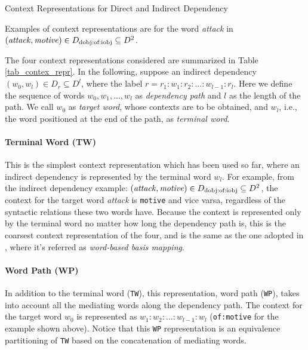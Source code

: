 \documentclass[english]{jnlp_1.4}
\begin{document}
\begin{table}[b]
\caption{Context Representations for Direct and Indirect Dependency}
\label{tab_contex_repr}
\begin{center}

\par
Examples of context representations are for the word {\em attack} in $({\it attack}, {\it motive}) \in D_{\rm dobj:of:iobj} \subseteq D^2$.
\end{center}
\end{table}

The four context representations considered are summarized in Table
\ref{tab_contex_repr}. In the following, suppose an indirect
dependency $(w_0, w_l) \in D_{r} \subseteq D^l$, where the label $r =
r_1:w_1:r_2:...:w_{l-1}:r_l$. Here we define the sequence of words
$w_0, w_1, ..., w_l$ as {\em dependency path} and $l$ as the length of
the path.  We call $w_0$ as {\em target word}, whose contexts are to
be obtained, and $w_l$, i.e., the word positioned at the end of the
path, as {\em terminal word}.

\paragraph{Terminal Word (TW)} \quad

This is the simplest context representation which has been used so
far, where an indirect dependency is represented by the terminal word
$w_l$. For example, from the indirect dependency example: $({\it
  attack}, {\it motive}) \in D_{\rm dobj:of:iobj} \subseteq D^2$, the
context for the target word {\em attack} is \verb|motive| and vice
varsa, regardless of the syntactic relations these two words
have. Because the context is represented only by the terminal word no
matter how long the dependency path is, this is the coarsest context
representation of the four, and is the same as the one adopted in
\cite{Pado:07}, where it's referred as {\em word-based basis mapping}.

\paragraph{Word Path (WP)} \quad

In addition to the terminal word (\verb|TW|), this representation,
word path (\verb|WP|), takes into account all the mediating words
along the dependency path. The context for the target word $w_0$ is
represented as $w_1:w_2:...:w_{l-1}:w_l$ (\verb|of:motive| for the
example shown above). Notice that this \verb|WP| representation is an
equivalence partitioning of \verb|TW| based on the concatenation of
mediating words.
\end{document}
